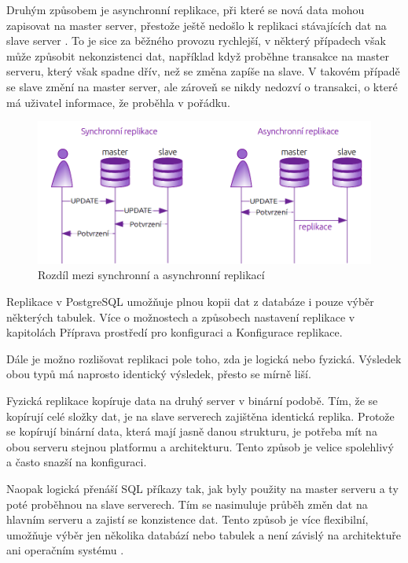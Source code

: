 Druhým způsobem je asynchronní replikace, při které se nová data mohou zapisovat na master server, přestože ještě nedošlo k replikaci stávajících dat na slave server \citep{ObeHsu2012}. To je sice za běžného provozu rychlejší, v některý případech však může způsobit nekonzistenci dat, například když proběhne transakce na master serveru, který však spadne dřív, než se změna zapíše na slave. V takovém případě se slave změní na master server, ale zároveň se nikdy nedozví o transakci, o které má uživatel informace, že proběhla v pořádku.

        \begin{figure}[H]
          \centering
          \includegraphics[scale=1]{../../../grafy/obr/schema_asyncSync_maxiTence.png}
          \caption {Rozdíl mezi synchronní a asynchronní replikací}
        \end{figure}

Replikace v PostgreSQL umožňuje plnou kopii dat z databáze i pouze výběr některých tabulek. Více o možnostech a způsobech nastavení replikace v kapitolách  Příprava prostředí pro konfiguraci a  Konfigurace replikace.

Dále je možno rozlišovat replikaci pole toho, zda je logická nebo fyzická. Výsledek obou typů má naprosto identický výsledek, přesto se mírně liší. 

Fyzická replikace kopíruje data na druhý server v binární podobě. Tím, že se kopírují celé složky dat, je na slave serverech zajištěna identická replika. Protože se kopírují binární data, která mají jasně danou strukturu, je potřeba mít na obou serveru stejnou platformu a architekturu. Tento způsob je velice spolehlivý a často snazší na konfiguraci. 

Naopak logická přenáší SQL příkazy tak, jak byly použity na master serveru a ty poté proběhnou na slave serverech. Tím se nasimuluje průběh změn dat na hlavním serveru a zajistí se konzistence dat. Tento způsob je více flexibilní, umožňuje výběr jen několika databází nebo tabulek a není závislý na architektuře ani operačním systému \citep{Boszormenyi2013}. 

